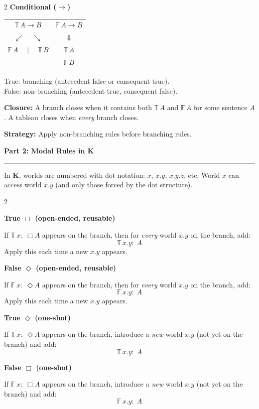 \documentclass[10pt]{article}
\newcommand{\T}{\mathbb{T}}
\newcommand{\F}{\mathbb{F}}
\newcommand{\ruleheader}[1]{\medskip\noindent\textbf{\large #1}\par\smallskip\hrule\smallskip}
\newcommand{\rulesubheader}[1]{\smallskip\noindent\textbf{#1}\par\smallskip}
\begin{document}
\begin{multicols}{2}
\rulesubheader{Conditional ($\rightarrow$)}

\begin{tabular}{@{}c@{\qquad\qquad}c@{}}
$\T\, A \rightarrow B$ & $\F\, A \rightarrow B$ \\[2pt]
$\swarrow\quad\searrow$ & $\Downarrow$ \\[2pt]
$\F\, A \quad\mid\quad \T\, B$ & $\T\, A$ \\
 & $\F\, B$
\end{tabular}

\smallskip
True: branching (antecedent false or consequent true).\\
False: non-branching (antecedent true, consequent false).

\end{multicols}

\medskip
\textbf{Closure:} A branch closes when it contains both $\T\, A$ and $\F\, A$ for some sentence $A$. A tableau closes when \emph{every} branch closes.

\textbf{Strategy:} Apply non-branching rules before branching rules.

\bigskip
\ruleheader{Part 2: Modal Rules in K}

In \textbf{K}, worlds are numbered with dot notation: $x$, $x.y$, $x.y.z$, etc. World $x$ can access world $x.y$ (and only those forced by the dot structure).

\begin{multicols}{2}

\rulesubheader{True $\Box$ (open-ended, reusable)}

If $\T\, x{:}\; \Box A$ appears on the branch, then for \emph{every} world $x.y$ on the branch, add:
$$\T\, x.y{:}\; A$$
Apply this each time a new $x.y$ appears.

\rulesubheader{False $\Diamond$ (open-ended, reusable)}

If $\F\, x{:}\; \Diamond A$ appears on the branch, then for \emph{every} world $x.y$ on the branch, add:
$$\F\, x.y{:}\; A$$
Apply this each time a new $x.y$ appears.

\columnbreak

\rulesubheader{True $\Diamond$ (one-shot)}

If $\T\, x{:}\; \Diamond A$ appears on the branch, introduce a \emph{new} world $x.y$ (not yet on the branch) and add:
$$\T\, x.y{:}\; A$$

\rulesubheader{False $\Box$ (one-shot)}

If $\F\, x{:}\; \Box A$ appears on the branch, introduce a \emph{new} world $x.y$ (not yet on the branch) and add:
$$\F\, x.y{:}\; A$$

\end{multicols}
\end{document}

